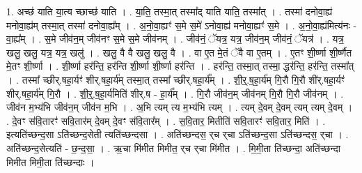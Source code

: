 \documentclass[17pt]{extarticle}
\begin{document}
1. अच्छ॑ याति या॒त्य च्छाच्छ॑ याति । . या॒ति॒ तस्मा॒त् तस्मा᳚द् याति याति॒ तस्मा᳚त् । . तस्मा॑ दनोवा॒ह्य॑ मनोवा॒ह्य॑म् तस्मा॒त् तस्मा॑ दनोवा॒ह्य᳚म् । . अ॒नो॒वा॒ह्यꣳ॑ स॒मे स॒मे॑ ऽनोवा॒ह्य॑ मनोवा॒ह्यꣳ॑ स॒मे । . अ॒नो॒वा॒ह्य॑मित्य॑नः - वा॒ह्य᳚म् । . स॒मे जीव॑न॒म् जीव॑नꣳ स॒मे स॒मे जीव॑नम् । . जीव॑नं॒ ॅयत्र॒ यत्र॒ जीव॑न॒म् जीव॑नं॒ ॅयत्र॑ । . यत्र॒ खलु॒ खलु॒ यत्र॒ यत्र॒ खलु॑ । . खलु॒ वै वै खलु॒ खलु॒ वै । . वा ए॒त मे॒तं ॅवै वा ए॒तम् । . ए॒तꣳ शी॒र्ष्णा शी॒र्ष्णैत मे॒तꣳ शी॒र्ष्णा । . शी॒र्ष्णा हर॑न्ति॒ हर॑न्ति शी॒र्ष्णा शी॒र्ष्णा हर॑न्ति । . हर॑न्ति॒ तस्मा॒त् तस्मा॒ द्धर॑न्ति॒ हर॑न्ति॒ तस्मा᳚त् । . तस्मा᳚ च्छीर्.षहा॒र्यꣳ॑ शीर्.षहा॒र्य॑म् तस्मा॒त् तस्मा᳚ च्छीर्.षहा॒र्य᳚म् । . शी॒र्॒.ष॒हा॒र्य॑म् गि॒रौ गि॒रौ शी॑र्.षहा॒र्यꣳ॑ शीर्.षहा॒र्य॑म् गि॒रौ । . शी॒र्॒.ष॒हा॒र्य॑मिति॑ शीर्.ष - हा॒र्य᳚म् । . गि॒रौ जीव॑न॒म् जीव॑नम् गि॒रौ गि॒रौ जीव॑नम् । . जीव॑न म॒भ्य॑भि जीव॑न॒म् जीव॑न म॒भि । . अ॒भि त्यम् त्य म॒भ्य॑भि त्यम् । . त्यम् दे॒वम् दे॒वम् त्यम् त्यम् दे॒वम् । . दे॒वꣳ स॑वि॒तारꣳ॑ सवि॒तार॑म् दे॒वम् दे॒वꣳ स॑वि॒तार᳚म् । . स॒वि॒तार॒ मितीति॑ सवि॒तारꣳ॑ सवि॒तार॒ मिति॑ । . इत्यति॑च्छन्द॒सा ऽति॑च्छन्द॒सेती त्यति॑च्छन्दसा । . अति॑च्छन्दस॒ र्‌च र्‌चा ऽति॑च्छन्द॒सा ऽति॑च्छन्दस॒ र्‌चा । . अति॑च्छन्द॒सेत्यति॑ - छ॒न्द॒सा॒ । . ऋ॒चा मि॑मीत मिमीत॒ र्‌च र्‌चा मि॑मीत । . मि॒मी॒ता ति॑च्छन्दा॒ अति॑च्छन्दा मिमीत मिमी॒ता ति॑च्छन्दाः । \newline
\end{document}
